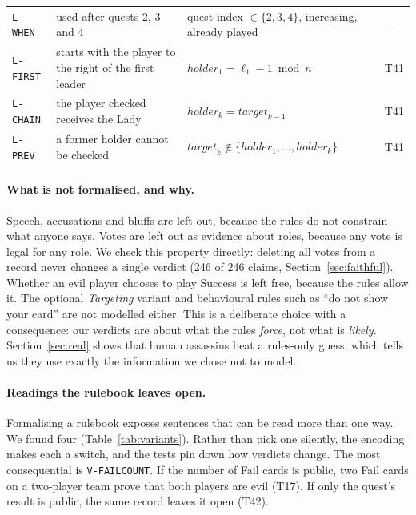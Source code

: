 \documentclass[runningheads]{llncs}
\newcommand{\cl}[1]{\texttt{#1}}
\begin{document}
\begin{table}[p]
\begin{tabularx}{\textwidth}{@{}l X >{\raggedright\arraybackslash}p{4.25cm} l@{}}
\cl{L-WHEN} & used after quests 2, 3 and 4 & quest index $\in\{2,3,4\}$, increasing, already played & ---\\
\cl{L-FIRST} & starts with the player to the right of the first leader & $\mathit{holder}_1=\ell_1-1 \bmod n$ & T41\\
\cl{L-CHAIN} & the player checked receives the Lady & $\mathit{holder}_k=\mathit{target}_{k-1}$ & T41\\
\cl{L-PREV} & a former holder cannot be checked & $\mathit{target}_k\notin\{\mathit{holder}_1,\dots,\mathit{holder}_k\}$ & T41\\
\bottomrule
\end{tabularx}
\end{table}

\paragraph{What is not formalised, and why.}
Speech, accusations and bluffs are left out, because the rules do not constrain what anyone says. Votes are left
out as evidence about roles, because any vote is legal for any role. We check this property directly: deleting all
votes from a record never changes a single verdict (246 of 246 claims, Section~\ref{sec:faithful}). Whether an evil
player chooses to play Success is left free, because the rules allow it. The optional \emph{Targeting} variant and
behavioural rules such as ``do not show your card'' are not modelled either.
This is a deliberate choice with a consequence: our verdicts are about what the rules \emph{force}, not what is
\emph{likely}. Section~\ref{sec:real} shows that human assassins beat a rules-only guess, which tells us they use
exactly the information we chose not to model.

\paragraph{Readings the rulebook leaves open.}
Formalising a rulebook exposes sentences that can be read more than one way. We found four
(Table~\ref{tab:variants}). Rather than pick one silently, the encoding makes each a switch, and the tests pin down
how verdicts change. The most consequential is \cl{V-FAILCOUNT}. If the number of Fail cards is public, two Fail
cards on a two-player team prove that both players are evil (T17). If only the quest's result is public, the same
record leaves it open (T42).
\end{document}
